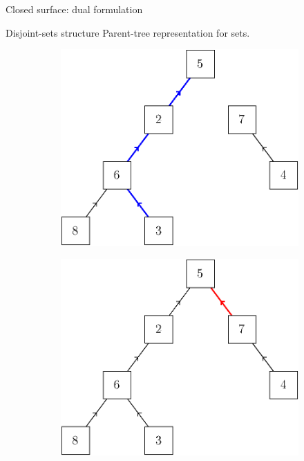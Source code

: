 \begin{frame}{Closed surface: dual formulation}
\end{frame}

\begin{frame}{Disjoint-sets structure}
	Parent-tree representation for sets.
	\begin{figure}
		\centering%
		\begin{subfigure}{0.45\textwidth}
			\includegraphics[width=\linewidth]{ds/disjoint_find}
		\end{subfigure}%
		\hspace{0.045\textwidth}%
		\vline%
		\hspace{0.045\textwidth}%
		\begin{subfigure}{0.45\textwidth}
			\includegraphics[width=\linewidth]{ds/disjoint_link}

\end{subfigure}
\end{figure}
\end{frame}
